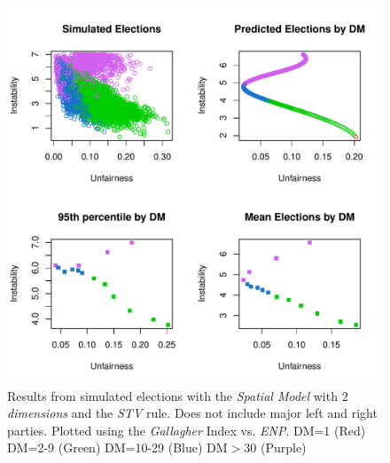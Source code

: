 \documentclass{article}
\begin{document}
\begin{figure}[]
\includegraphics[scale=1.00]{images/stv_spatial2pure_gallagher_enp.pdf}
\caption{Results from simulated elections with the \emph{Spatial Model} with \emph{$2$ dimensions} and the \emph{STV} rule. Does not include major left and right parties. Plotted using the \emph{Gallagher} Index vs. \emph{ENP}. DM=1 (Red) DM=2-9 (Green) DM=10-29 (Blue) DM$>$30 (Purple)}
\label{fig:stv_spatial2pure}
\end{figure}
\end{document}

